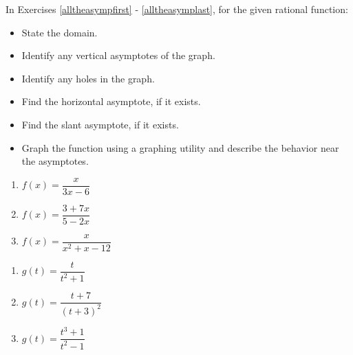 In Exercises \ref{alltheasympfirst} - \ref{alltheasymplast}, for the given rational function:

\begin{multicols}{2}
\begin{itemize}

\item State the domain.
\item Identify any vertical asymptotes of the graph.

\end{itemize}
\end{multicols}

\begin{multicols}{2}
\begin{itemize}

\item Identify any holes in the graph.
\item Find the horizontal asymptote, if it exists.

\end{itemize}
\end{multicols}

\begin{multicols}{2}
\begin{itemize}

\item Find the slant asymptote, if it exists.
\item Graph the function using a graphing utility and describe the behavior near the asymptotes.

\end{itemize}
\end{multicols}

\begin{multicols}{3}
\begin{enumerate}
\setcounter{enumi}{\value{HW}}

\item $f(x) = \dfrac{x}{3x - 6}$ \label{alltheasympfirst}
\item $f(x) = \dfrac{3 + 7x}{5 - 2x}$
\item $f(x) = \dfrac{x}{x^{2} + x - 12}$

\setcounter{HW}{\value{enumi}}
\end{enumerate}
\end{multicols}

\begin{multicols}{3}
\begin{enumerate}
\setcounter{enumi}{\value{HW}}

\item $g(t) = \dfrac{t}{t^{2} + 1}$
\item $g(t) = \dfrac{t + 7}{(t + 3)^{2}}$
\item $g(t) = \dfrac{t^{3} + 1}{t^{2} - 1}$

\setcounter{HW}{\value{enumi}}
\end{enumerate}
\end{multicols}

